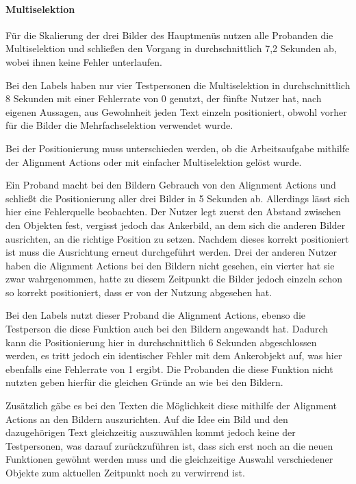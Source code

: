 \paragraph{Multiselektion}
Für die Skalierung der drei Bilder des Hauptmenüs nutzen alle Probanden die Multiselektion und schließen den Vorgang in durchschnittlich 7,2 Sekunden ab, wobei ihnen keine Fehler unterlaufen.

Bei den Labels haben nur vier Testpersonen die Multiselektion in durchschnittlich 8 Sekunden mit einer Fehlerrate von 0 genutzt, der fünfte Nutzer hat, nach eigenen Aussagen, aus Gewohnheit jeden Text einzeln positioniert, obwohl vorher für die Bilder die Mehrfachselektion verwendet wurde.

Bei der Positionierung muss unterschieden werden, ob die Arbeitsaufgabe mithilfe der Alignment Actions oder mit einfacher Multiselektion gelöst wurde.

Ein Proband macht bei den Bildern Gebrauch von den Alignment Actions und schließt die Positionierung aller drei Bilder in 5 Sekunden ab.
Allerdings lässt sich hier eine Fehlerquelle beobachten.
Der Nutzer legt zuerst den Abstand zwischen den Objekten fest, vergisst jedoch das Ankerbild, an dem sich die anderen Bilder ausrichten, an die richtige Position zu setzen.
Nachdem dieses korrekt positioniert ist muss die Ausrichtung erneut durchgeführt werden.
Drei der anderen Nutzer haben die Alignment Actions bei den Bildern nicht gesehen, ein vierter hat sie zwar wahrgenommen, hatte zu diesem Zeitpunkt die Bilder jedoch einzeln schon so korrekt positioniert, dass er von der Nutzung abgesehen hat.

Bei den Labels nutzt dieser Proband die Alignment Actions, ebenso die Testperson die diese Funktion auch bei den Bildern angewandt hat.
Dadurch kann die Positionierung hier in durchschnittlich 6 Sekunden abgeschlossen werden, es tritt jedoch ein identischer Fehler mit dem Ankerobjekt auf, was hier ebenfalls eine Fehlerrate von 1 ergibt.
Die Probanden die diese Funktion nicht nutzten geben hierfür die gleichen Gründe an wie bei den Bildern.

Zusätzlich gäbe es bei den Texten die Möglichkeit diese mithilfe der Alignment Actions an den Bildern auszurichten.
Auf die Idee ein Bild und den dazugehörigen Text gleichzeitig auszuwählen kommt jedoch keine der Testpersonen, was darauf zurückzuführen ist, dass sich erst noch an die neuen Funktionen gewöhnt werden muss und die gleichzeitige Auswahl verschiedener Objekte zum aktuellen Zeitpunkt noch zu verwirrend ist.

